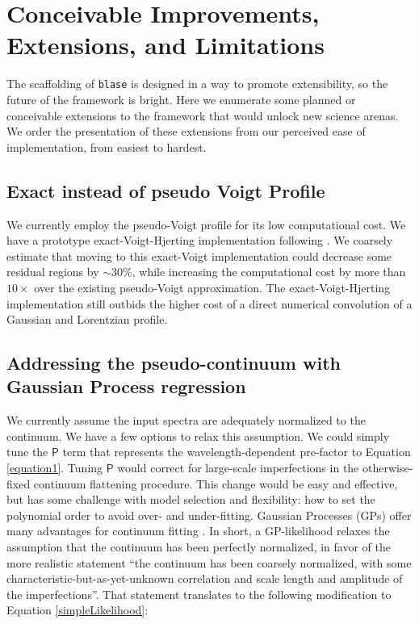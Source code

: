 \documentclass[twocolumn]{aastex631}
\begin{document}
\section{Conceivable Improvements, Extensions, and Limitations}\label{secFutureWork}

The scaffolding of \texttt{blase} is designed in a way to promote extensibility, so the future of the framework is bright.  Here we enumerate some planned or conceivable extensions to the framework that would unlock new science arenas.  We order the presentation of these extensions from our perceived ease of implementation, from easiest to hardest.

\subsection{Exact instead of pseudo Voigt Profile}
We currently employ the pseudo-Voigt profile for its low computational cost.  We have a prototype exact-Voigt-Hjerting implementation following \citet{2022ApJS..258...31K}.  We coarsely estimate that moving to this exact-Voigt implementation could decrease some residual regions by $\sim 30\%$, while increasing the computational cost by more than $10\times$ over the existing pseudo-Voigt approximation.  The exact-Voigt-Hjerting implementation still outbids the higher cost of a direct numerical convolution of a Gaussian and Lorentzian profile.



\subsection{Addressing the pseudo-continuum with Gaussian Process regression}

We currently assume the input spectra are adequately normalized to the continuum.  We have a few options to relax this assumption.  We could  simply tune the $\mathsf{P}$ term that represents the wavelength-dependent pre-factor to Equation \ref{equation1}.  Tuning $\mathsf{P}$ would correct for large-scale imperfections in the otherwise-fixed continuum flattening procedure.  This change would be easy and effective, but has some challenge with model selection and flexibility: how to set the polynomial order to avoid over- and under-fitting.  Gaussian Processes (GPs) offer many advantages for continuum fitting \citet{czekala15}.  In short, a GP-likelihood relaxes the assumption that the continuum has been perfectly normalized, in favor of the more realistic statement ``the continuum has been coarsely normalized, with some characteristic-but-as-yet-unknown correlation and scale length and amplitude of the imperfections''.  That statement translates to the following modification to Equation \ref{simpleLikelihood}:
\end{document}
